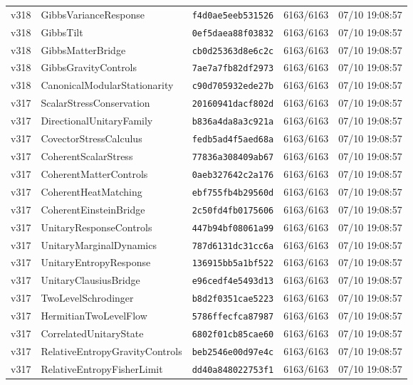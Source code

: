 \documentclass[11pt]{article}
\theoremstyle{definition}\newtheorem{deriv}{Derivação}
\begin{document}
{\begin{longtable}{@{}lllll@{}}
v318 & GibbsVarianceResponse & \texttt{f4d0ae5eeb531526} & 6163/6163 & 07/10 19:08:57 \\
v318 & GibbsTilt & \texttt{0ef5daea88f03832} & 6163/6163 & 07/10 19:08:57 \\
v318 & GibbsMatterBridge & \texttt{cb0d25363d8e6c2c} & 6163/6163 & 07/10 19:08:57 \\
v318 & GibbsGravityControls & \texttt{7ae7a7fb82df2973} & 6163/6163 & 07/10 19:08:57 \\
v318 & CanonicalModularStationarity & \texttt{c90d705932ede27b} & 6163/6163 & 07/10 19:08:57 \\
v317 & ScalarStressConservation & \texttt{20160941dacf802d} & 6163/6163 & 07/10 19:08:57 \\
v317 & DirectionalUnitaryFamily & \texttt{b836a4da8a3c921a} & 6163/6163 & 07/10 19:08:57 \\
v317 & CovectorStressCalculus & \texttt{fedb5ad4f5aed68a} & 6163/6163 & 07/10 19:08:57 \\
v317 & CoherentScalarStress & \texttt{77836a308409ab67} & 6163/6163 & 07/10 19:08:57 \\
v317 & CoherentMatterControls & \texttt{0aeb327642c2a176} & 6163/6163 & 07/10 19:08:57 \\
v317 & CoherentHeatMatching & \texttt{ebf755fb4b29560d} & 6163/6163 & 07/10 19:08:57 \\
v317 & CoherentEinsteinBridge & \texttt{2c50fd4fb0175606} & 6163/6163 & 07/10 19:08:57 \\
v317 & UnitaryResponseControls & \texttt{447b94bf08061a99} & 6163/6163 & 07/10 19:08:57 \\
v317 & UnitaryMarginalDynamics & \texttt{787d6131dc31cc6a} & 6163/6163 & 07/10 19:08:57 \\
v317 & UnitaryEntropyResponse & \texttt{136915bb5a1bf522} & 6163/6163 & 07/10 19:08:57 \\
v317 & UnitaryClausiusBridge & \texttt{e96cedf4e5493d13} & 6163/6163 & 07/10 19:08:57 \\
v317 & TwoLevelSchrodinger & \texttt{b8d2f0351cae5223} & 6163/6163 & 07/10 19:08:57 \\
v317 & HermitianTwoLevelFlow & \texttt{5786ffecfca87987} & 6163/6163 & 07/10 19:08:57 \\
v317 & CorrelatedUnitaryState & \texttt{6802f01cb85cae60} & 6163/6163 & 07/10 19:08:57 \\
v317 & RelativeEntropyGravityControls & \texttt{beb2546e00d97e4c} & 6163/6163 & 07/10 19:08:57 \\
v317 & RelativeEntropyFisherLimit & \texttt{dd40a848022753f1} & 6163/6163 & 07/10 19:08:57 \\

\end{longtable}}
\end{document}
